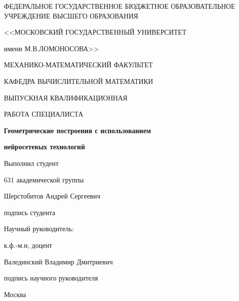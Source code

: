 \begin{titlepage}
  \begin{center}
    ФЕДЕРАЛЬНОЕ ГОСУДАРСТВЕННОЕ БЮДЖЕТНОЕ ОБРАЗОВАТЕЛЬНОЕ УЧРЕЖДЕНИЕ ВЫСШЕГО ОБРАЗОВАНИЯ

    <<МОСКОВСКИЙ ГОСУДАРСТВЕННЫЙ УНИВЕРСИТЕТ

    имени М.В.ЛОМОНОСОВА>>

    \vspace{0.7cm}

    МЕХАНИКО-МАТЕМАТИЧЕСКИЙ ФАКУЛЬТЕТ

    \vspace{0.7cm}

    КАФЕДРА ВЫЧИСЛИТЕЛЬНОЙ МАТЕМАТИКИ

    \vspace{3cm}

    ВЫПУСКНАЯ КВАЛИФИКАЦИОННАЯ

		РАБОТА СПЕЦИАЛИСТА

    \vspace{0.7cm}

    \textbf{Геометрические построения с использованием}

		\textbf{нейросетевых технологий}

  \end{center}

  \vspace{2cm}

  \hfill
  \begin{minipage}{0.5\textwidth}
    Выполнил студент

    631 академической группы 

    Шерстобитов Андрей Сергеевич

    \vspace{1cm}

    \underline{\hspace{4cm}}

    подпись студента

    \vspace{0.5cm}

    Научный руководитель:

    к.ф.-м.н, доцент 

    Валединский Владимир Дмитриевич

    \vspace{1cm}

    \underline{\hspace{4cm}}

    подпись научного руководителя
 \end{minipage}

  \vfill

  \begin{center}
    \large Москва

    \the\year
  \end{center}

\end{titlepage}
